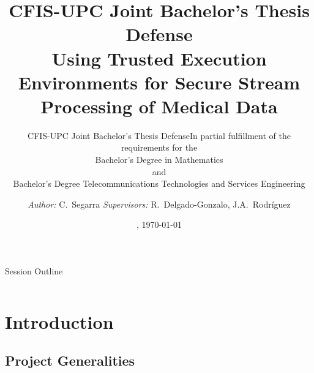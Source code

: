\documentclass[10pt,    %
    english,            %
    xcolor=table,       %
    envcountsect,        %
    aspectratio=169     %
]{beamer}
\subtitle{CFIS-UPC Joint Bachelor's Thesis Defense} %
\title[TEEs for Secure Stream Processing] %
    {\normalsize CFIS-UPC Joint Bachelor's Thesis Defense \\ \Large Using Trusted Execution Environments for Secure Stream Processing of Medical Data}
\subtitle{\small \textmd{In partial fulfillment of the requirements for the} \\
\normalsize Bachelor's Degree in Mathematics \\ \small \textmd{and} \\ \normalsize Bachelor's Degree Telecommunications Technologies and Services Engineering \vspace{-10pt}} %
\date[Thursday, May 30th] %
    {\datedayname, \today}
\author[] %
{\textit{Author:} C.~Segarra\inst{1, 2} \hfill \textit{Supervisors:} R.~Delgado-Gonzalo\inst{1}, J.A.~Rodr\'iguez\inst{2}}
\institute[] %
{\inst{1} Swiss Center for Electronics and Microtechnology (CSEM), Neuch\^atel, Switzerland, \texttt{\{first.last\}@csem.ch} \and
\inst{2} Universitat Polit\`ecnica de Catalunya (UPC), Spain \texttt{\{p.aublin,prp\}@imperial.ac.uk}
}
\begin{document}
\begin{frame}
  \titlepage
\end{frame}

\begin{frame}{Session Outline}
    \begin{columns}[T,onlytextwidth]
        \begin{column}{.48\textwidth}
            \tableofcontents[sections={1-2}]
        \end{column}
        \begin{column}{.48\textwidth}
            \tableofcontents[sections={3-5}]
        \end{column}
    \end{columns}
\end{frame}

\section{Introduction}
\label{sec:introduction}
\sectionframe

\subsection{Project Generalities}
\end{document}
